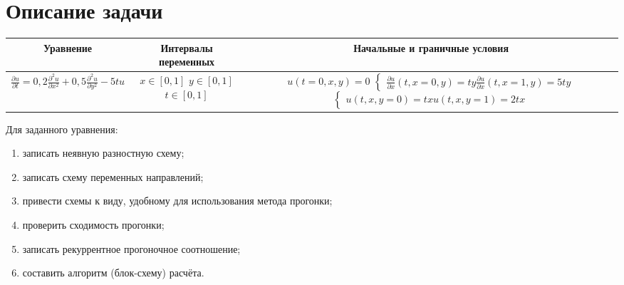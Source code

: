 \documentclass[12pt, a4paper]{report}
\begin{document}
	\section*{Описание задачи}
	\large
	\begin{center}
		\begin{tabular}{||c|c|c||}
			\hline
			Уравнение & \makecell{Интервалы \\ переменных} & Начальные и граничные условия \\

			\hline
			\small 
			$ \frac{\partial u}{\partial t} = 0,2\frac{\partial^{2} u}{\partial x^{2}} + 0,5\frac{\partial^{2} u}{\partial y^{2}} - 5tu $ & \makecell{$ x \in [0, 1] $ \\ $ y \in [0, 1] $ \\ $ t \in [0, 1] $} & \makecell{$ u(t = 0, x, y) = 0 $ \\ $\begin{cases} \frac{\partial u}{\partial x}(t, x = 0, y) = ty \\ \frac{\partial u}{\partial x}(t, x = 1, y) = 5ty \end{cases}$ \\ $\begin{cases} u(t, x, y = 0) = tx \\ u(t, x, y = 1) = 2tx \end{cases}$} \\

			\hline
		\end{tabular}
	\end{center}

	Для заданного уравнения:
	\begin{enumerate}
		\item записать неявную разностную схему;
		\item записать схему переменных направлений;
		\item привести схемы к виду, удобному для использования метода прогонки;
		\item проверить сходимость прогонки;
		\item записать рекуррентное прогоночное соотношение;
		\item составить алгоритм (блок-схему) расчёта.
	\end{enumerate}
\end{document}
